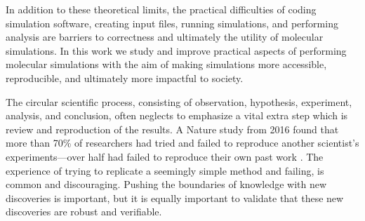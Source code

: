 In addition to these theoretical limits, the practical difficulties of coding simulation software, creating input files, running simulations, and performing analysis are barriers to correctness and ultimately the utility of molecular simulations. 
In this work we study and improve practical aspects of performing molecular simulations with the aim of making simulations more accessible, reproducible, and ultimately more impactful to society.

The circular scientific process, consisting of observation, hypothesis, experiment, analysis, and conclusion, often neglects to emphasize a vital extra step which is review and reproduction of the results. 
A Nature study from 2016 found that more than 70\% of researchers had tried and failed to reproduce another scientist’s experiments---over half had failed to reproduce their own past work \cite{Baker2016}.
The experience of trying to replicate a seemingly simple method and failing, is common and discouraging.
Pushing the boundaries of knowledge with new discoveries is important, but it is equally important to validate that these new discoveries are robust and verifiable.

